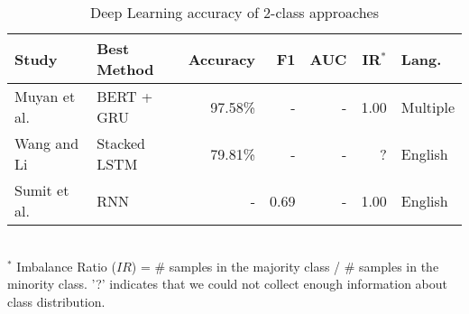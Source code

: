 \begin{table}[ht]
    \caption{Deep Learning accuracy of 2-class approaches }
    \label{tab:DL_performance_2class}
    \centering
    \begin{tabular}{m{} l r r r r l}
        \toprule
        \textbf{Study} & \textbf{Best Method} & \textbf{Accuracy} & \textbf{F1} & \textbf{AUC} & \textbf{IR$^*$} & \textbf{Lang.} \\ 
        \midrule
        Muyan et al.~\cite{Li2022_lr2019} & BERT + GRU & 97.58\% & - & - & 1.00 & Multiple \\
        Wang and Li~\cite{Wang2020_lr26} &  Stacked LSTM & 79.81\% & - & - & ? & English \\
        Sumit et al.~\cite{Asthana2021_lr76} & RNN & - & 0.69 & - & 1.00 & English \\
        \bottomrule
    \end{tabular}
    \\ \vspace{0.1cm}
    \footnotesize
    $^*$ Imbalance Ratio ($IR$) = \# samples in the majority class / \# samples in the minority class. '?' indicates that we could not collect enough information about class distribution.
\end{table}